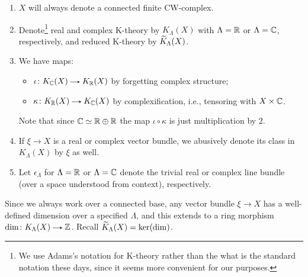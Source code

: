 \begin{notation}
  \begin{enumerate}[leftmargin=*]
  \item $X$ will always denote a connected finite CW-complex.
  \item Denote\footnote{We use Adams's notation for K-theory rather
      than the what is the standard notation these days, since it
      seems more convenient for our purposes.} real and complex
    K-theory by $K_\Lambda(X)$ with $\Lambda = \mathbb{R}$ or $\Lambda = \mathbb{C}$,
    respectively, and reduced K-theory by $\widetilde K_\Lambda(X)$.
  \item We have maps:
    \begin{itemize}
    \item $\iota \c K_\C(X) \to K_\R(X)$ by forgetting complex
      structure;
    \item $\kappa \c K_\R(X) \to K_\C(X)$ by complexification, i.e.,
      tensoring with $X \times \mathbb{C}$.
    \end{itemize}
    Note that since $\mathbb{C} \simeq \mathbb{R} \oplus \mathbb{R}$ the map $\iota \circ
    \kappa$ is just multiplication by $2$.
  \item If $\xi \to X$ is a real or complex vector bundle, we
    abusively denote its class in $K_\Lambda(X)$ by $\xi$ as well.
  \item Let $\epsilon_\Lambda$ for $\Lambda = \mathbb{R}$ or $\Lambda = \mathbb{C}$
    denote the trivial real or complex line bundle (over a space
    understood from context), respectively.
  \end{enumerate}
\end{notation}

\begin{remark}
  \label{dimension-welldefined}
  Since we always work over a connected base, any vector bundle $\xi
  \to X$ has a well-defined dimension over a specified $\Lambda$, and
  this extends to a ring morphism $\dim \c K_\Lambda(X) \to \Z$. Recall
  $\widetilde K_\Lambda(X) = \ker(\dim)$.
\end{remark}

